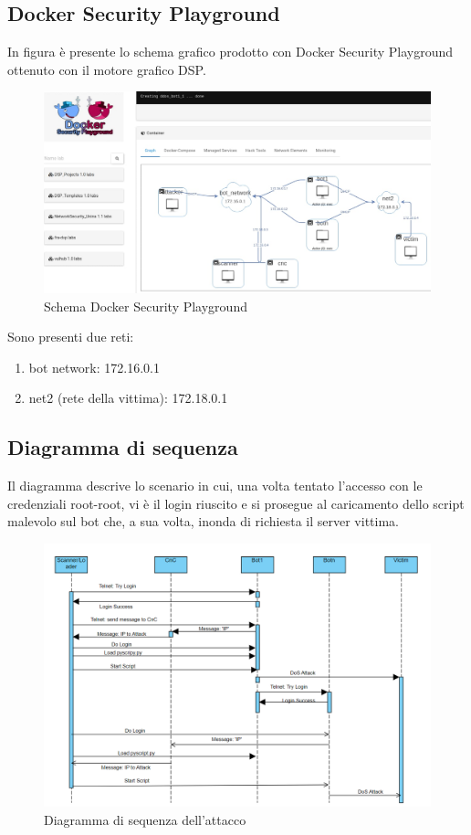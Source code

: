 \subsection{Docker Security Playground}
In figura è presente lo schema grafico prodotto con Docker Security Playground ottenuto con il motore grafico DSP. 
\begin{figure}[H]
    \centering
    \includegraphics[scale=0.3]{UNINA_MSc_Thesis_Project/img/Esecuzione/DSP Schema.jpg}
    \caption{Schema Docker Security Playground}
    \label{fig:my_label}
\end{figure}
Sono presenti due reti:
\begin{enumerate}
    \item bot network: 172.16.0.1
    \item net2 (rete della vittima): 172.18.0.1
\end{enumerate}




\subsection{Diagramma di sequenza}
Il diagramma descrive lo scenario in cui, una volta tentato l'accesso con le credenziali root-root, vi è il login riuscito e si prosegue al caricamento dello script malevolo sul bot che, a sua volta, inonda di richiesta il server vittima.

\begin{figure}[H]
    \centering
    \includegraphics[scale=0.5]{UNINA_MSc_Thesis_Project/img/Esecuzione/sequence_attack.png}
    \caption{Diagramma di sequenza dell'attacco}
    \label{fig:my_label}
\end{figure}

